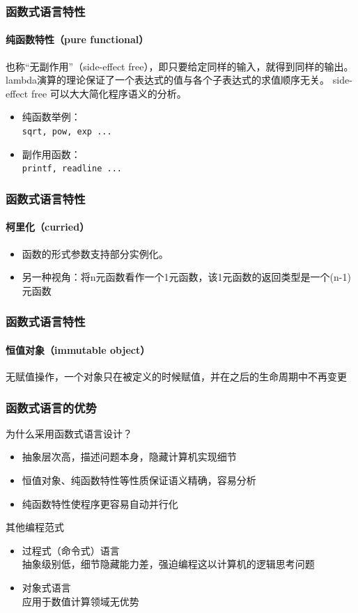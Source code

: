 \documentclass{beamer}
\begin{document}
\begin{frame}
  \frametitle{函数式语言特性}
  \framesubtitle{纯函数特性（pure functional）}
  也称“无副作用”（side-effect free），即只要给定同样的输入，就得到同样的输出。
  lambda演算的理论保证了一个表达式的值与各个子表达式的求值顺序无关。
  side-effect free 可以大大简化程序语义的分析。
  \begin{itemize}
    \item 纯函数举例：\\\texttt{sqrt, pow, exp ...}
    \item 副作用函数：\\\texttt{printf, readline ...}
  \end{itemize}
\end{frame}

\begin{frame}
  \frametitle{函数式语言特性}
  \framesubtitle{柯里化（curried）}
  \begin{itemize}
    \item<1-> 函数的形式参数支持部分实例化。
      
    \item<2-> 另一种视角：将n元函数看作一个1元函数，该1元函数的返回类型是一个(n-1)元函数
      
  \end{itemize}
\end{frame}

\begin{frame}
  \frametitle{函数式语言特性}
  \framesubtitle{恒值对象（immutable object）}
  无赋值操作，一个对象只在被定义的时候赋值，并在之后的生命周期中不再变更
  
\end{frame}

\begin{frame}
  \frametitle{函数式语言的优势}
  为什么采用函数式语言设计？
  \begin{itemize}
    \item 抽象层次高，描述问题本身，隐藏计算机实现细节
    \item 恒值对象、纯函数特性等性质保证语义精确，容易分析
    \item 纯函数特性使程序更容易自动并行化
  \end{itemize}
  \pause
  其他编程范式
  \begin{itemize}
    \item 过程式（命令式）语言\\
      抽象级别低，细节隐藏能力差，强迫编程这以计算机的逻辑思考问题
    \item 对象式语言\\
      应用于数值计算领域无优势
  \end{itemize}
\end{frame}
\end{document}
